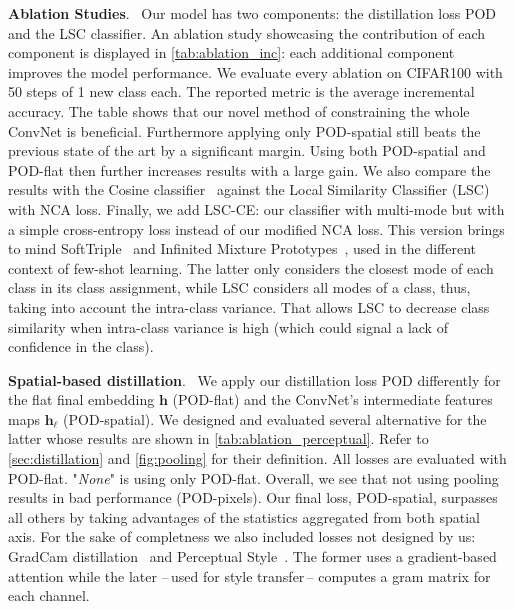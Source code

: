 \documentclass[runningheads]{llncs}
\newcommand{\vh}{\mathbf{h}}
\newcommand{\parag}[1]{\vspace{0.2cm}\noindent\textbf{#1}.\ }
\begin{document}
\parag{Ablation Studies}
Our model has two components: the distillation loss POD and the LSC classifier. An ablation study showcasing the contribution of each component is displayed in \autoref{tab:ablation_inc}: each additional component improves the model performance. We evaluate every ablation on CIFAR100 with 50 steps of 1 new class each. The reported metric is the average incremental accuracy. The table shows that our novel method of constraining the whole ConvNet is beneficial. Furthermore applying only POD-spatial still beats the previous state of the art by a significant margin. Using both POD-spatial and POD-flat then further increases results with a large gain. We also compare the results with the Cosine classifier~\cite{luo2018cosine_classifier,hou2019ucir} against the Local Similarity Classifier (LSC) with NCA loss. Finally, we add LSC-CE: our classifier with multi-mode but with a simple cross-entropy loss instead of our modified NCA loss. This version brings to mind SoftTriple~\cite{qian2019softtriple} and Infinited Mixture Prototypes~\cite{allen2019infinitemixtureproto}, used in the different context of few-shot learning.
The latter only considers the closest mode of each class in its class assignment, while LSC considers all modes of a class, thus, taking into account the intra-class variance. That allows LSC to decrease class similarity when intra-class variance is high (which could signal a lack of confidence in the class).

\label{sec:ablation_pooling}
\parag{Spatial-based distillation} We apply our distillation loss POD differently for the flat final embedding $\vh$ (POD-flat) and the ConvNet's intermediate features maps $\vh_\ell$ (POD-spatial). We designed and evaluated several alternative for the latter whose results are shown in \autoref{tab:ablation_perceptual}. Refer to \autoref{sec:distillation} and \autoref{fig:pooling} for their definition. All losses are evaluated with POD-flat. "\textit{None}" is using only POD-flat.
Overall, we see that not using pooling results in bad performance (POD-pixels). Our final loss, POD-spatial, surpasses all others by taking advantages of the statistics aggregated from both spatial axis. For the sake of completness we also included losses not designed by us: GradCam distillation~\cite{dhar2019learning_without_memorizing_gradcam} and Perceptual Style~\cite{johnson2016perceptual_losses}. The former uses a gradient-based attention while the later --\,used for style transfer\,-- computes a gram matrix for each channel.
\end{document}
